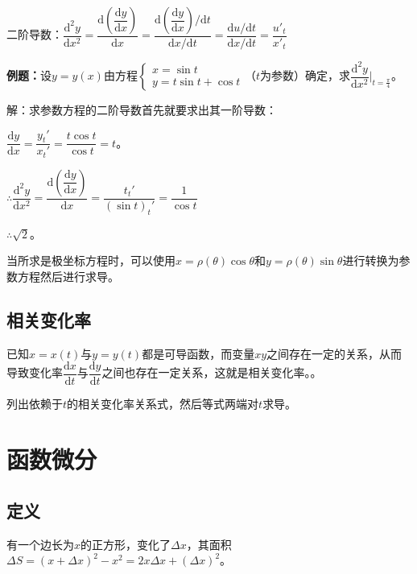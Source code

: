 \documentclass[UTF8, 12pt]{ctexart}
\begin{document}
二阶导数：$\dfrac{\textrm{d}^2y}{\textrm{d}x^2}=\dfrac{\textrm{d}\left(\dfrac{\textrm{d}y}{\textrm{d}x}\right)}{\textrm{d}x}=\dfrac{\textrm{d}\left(\dfrac{\textrm{d}y}{\textrm{d}x}\right)/\textrm{d}t}{\textrm{d}x/\textrm{d}t}=\dfrac{\textrm{d}u/\textrm{d}t}{\textrm{d}x/\textrm{d}t}=\dfrac{u'_t}{x'_t}$

\textbf{例题：}设$y=y(x)$由方程$\left\{
\begin{array}{l}
    x=\sin t \\
    y=t\sin t+\cos t
\end{array}
\right.
$（$t$为参数）确定，求$\dfrac{\textrm{d}^2y}{\textrm{d}x^2}\vert_{t=\frac{\pi}{4}}$。

解：求参数方程的二阶导数首先就要求出其一阶导数：\medskip

$\dfrac{\textrm{d}y}{\textrm{d}x}=\dfrac{y_t'}{x_t'}=\dfrac{t\cos t}{\cos t}=t$。\medskip

$\therefore\dfrac{\textrm{d}^2y}{\textrm{d}x^2}=\dfrac{\textrm{d}\left(\dfrac{\textrm{d}y}{\textrm{d}x}\right)}{\textrm{d}x}=\dfrac{t_t'}{(\sin t)_t'}=\dfrac{1}{\cos t}$\medskip

$\therefore \sqrt{2}$。

当所求是极坐标方程时，可以使用$x=\rho(\theta)\cos\theta$和$y=\rho(\theta)\sin\theta$进行转换为参数方程然后进行求导。

\subsection{相关变化率}

已知$x=x(t)$与$y=y(t)$都是可导函数，而变量$xy$之间存在一定的关系，从而导致变化率$\dfrac{\textrm{d}x}{\textrm{d}t}$与$\dfrac{\textrm{d}y}{\textrm{d}t}$之间也存在一定关系，这就是相关变化率。。

列出依赖于$t$的相关变化率关系式，然后等式两端对$t$求导。

\section{函数微分}

\subsection{定义}

有一个边长为$x$的正方形，变化了$\Delta x$，其面积$\Delta S=(x+\Delta x)^2-x^2=2x\Delta x+(\Delta x)^2$。
\end{document}
